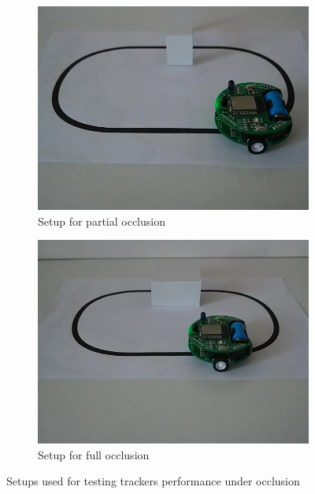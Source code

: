 \begin{figure}
\centering
\begin{subfigure}{0.48\linewidth}
\includegraphics[width=\linewidth]{img/experiments/partial-occlusion.jpg}
\caption{Setup for partial occlusion}
\label{fig:partial-occlusion}
\end{subfigure}
\begin{subfigure}{0.48\linewidth}
\includegraphics[width=\linewidth]{img/experiments/full-occlusion.jpg}
\caption{Setup for full occlusion}
\label{fig:full-occlusion}
\end{subfigure}
\caption{Setups used for testing trackers performance under occlusion}
\label{fig:additional-occlusion}
\end{figure}
